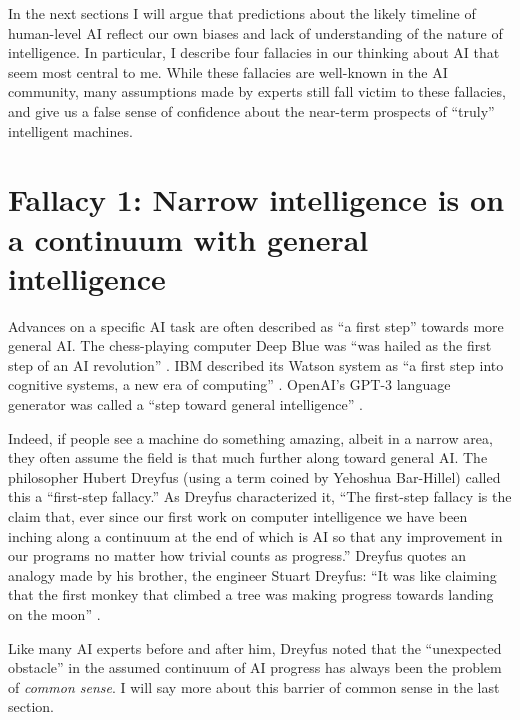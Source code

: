 \documentclass[12pt]{article}
\begin{document}
In the next sections I will argue that predictions about the likely timeline of human-level AI reflect our own biases and lack of understanding of the nature of intelligence.  In particular, I describe four fallacies in our thinking about AI that seem most central to me. While these fallacies are well-known in the AI community, many assumptions made by experts still fall victim to these fallacies, and give us a false sense of confidence about the near-term prospects of ``truly'' intelligent machines.

\section*{Fallacy 1: Narrow intelligence is on a continuum with general intelligence}
Advances on a specific AI task are often described as ``a first step'' towards more general AI.  The chess-playing computer Deep Blue was ``was hailed as the first step of an AI revolution'' \cite{NewScientist2016}. IBM described its Watson system as ``a first step into cognitive systems, a new era of computing'' \cite{IBM2013}.  OpenAI's GPT-3 language generator was called a ``step toward general intelligence'' \cite{SSC2019}. 

Indeed, if people see a machine do something amazing, albeit in a narrow area, they often assume the field is that much further along toward general AI.  The philosopher Hubert Dreyfus (using a term coined by Yehoshua Bar-Hillel) called this a ``first-step fallacy.'' As Dreyfus characterized it, ``The first-step fallacy is the claim that, ever since our first work on computer intelligence we have been inching along a continuum at the end of which is AI so that any improvement in our programs no matter how trivial counts as progress.''   Dreyfus quotes an analogy made by his brother, the engineer Stuart Dreyfus: ``It was like claiming that the first monkey that climbed a tree was making progress towards landing on the moon'' \cite{Dreyfus2012}.

Like many AI experts before and after him, Dreyfus noted that the ``unexpected obstacle'' in the assumed continuum of AI progress has always been the problem of \textit{common sense}.  I will say more about this barrier of common sense in the last section.  
\end{document}
